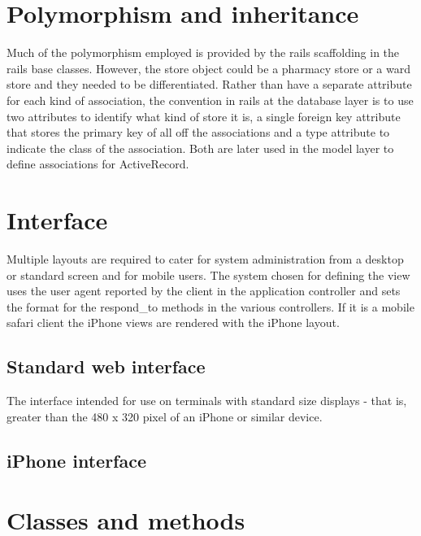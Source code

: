 \documentclass[letterpaper]{amsart}
\begin{document}
\section{Polymorphism and inheritance}
Much of the polymorphism employed is provided by the rails scaffolding in the rails base classes.  However, the store object could be a pharmacy store or a ward store and they needed to be differentiated.  Rather than have a separate attribute for each kind of association, the convention in rails at the database layer is to use two attributes to identify what kind of store it is, a single foreign key attribute that stores the primary key of all off the associations and a type attribute to indicate the class of the association.  Both are later used in the model layer to define associations for ActiveRecord.


\section{Interface}
Multiple layouts are required to cater for system administration from a desktop or standard screen and for mobile users.  The system chosen for defining the view uses the user agent reported by the client in the application controller and sets the format for the respond\_to methods in the various controllers.  If it is a mobile safari client the iPhone views are rendered with the iPhone layout.  
\subsection{Standard web interface}
The interface intended for use on terminals with standard size displays - that is, greater than the 480 x 320 pixel\cite{iphonespecs} of an iPhone or similar device.  
\subsection{iPhone interface}
\section{Classes and methods}
\end{document}
